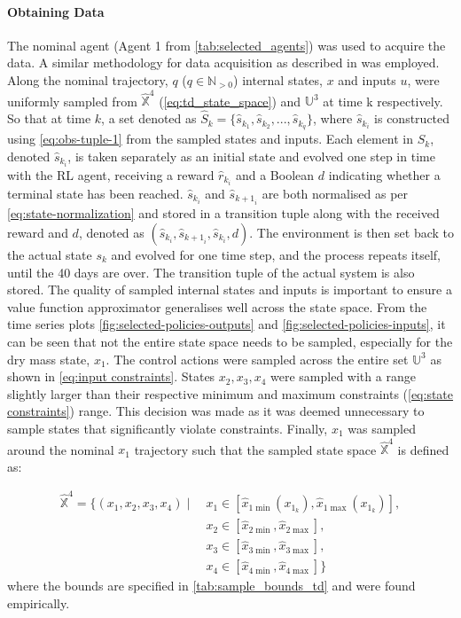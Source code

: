 \paragraph{Obtaining Data}
The nominal agent (Agent 1 from \autoref{tab:selected_agents}) was used to acquire the data. A similar methodology for data acquisition as described in \citet{linReinforcementLearningBasedModel2023} was employed. Along the nominal trajectory, $q$ ($q \in \mathbb{N}_{>0}$) internal states, $x$ and inputs $u$, were uniformly sampled from $\hat{\mathbb{X}}^4$ (\autoref{eq:td_state_space}) and ${\mathbb{U}}^3$ at time k respectively. So that at time $k$, a set denoted as $\hat{S}_{k} = \{\hat{s}_{k_1},\hat{s}_{k_2},...,\hat{s}_{k_q}\}$, where $\hat{s}_{k_i}$ is constructed using \autoref{eq:obs-tuple-1} from the sampled states and inputs. Each element in $\hat{S}_k$, denoted $\hat{s}_{k_i}$, is taken separately as an initial state and evolved one step in time with the RL agent, receiving a reward $\hat{r}_{k_i}$ and a Boolean $d$ indicating whether a terminal state has been reached. $\hat{s}_{k_i}$ and $\hat{s}_{{k+1}_i}$  are both normalised as per \autoref{eq:state-normalization} and stored in a transition tuple along with the received reward and $d$, denoted as $(\hat{s}_{k_i},\hat{s}_{{k+1}_i},\hat{s}_{k_i},d)$. The environment is then set back to the actual state $s_k$ and evolved for one time step, and the process repeats itself, until the 40 days are over. The transition tuple of the actual system is also stored. The quality of sampled internal states and inputs is important to ensure a value function approximator generalises well across the state space. From the time series plots \autoref{fig:selected-policies-outputs} and \autoref{fig:selected-policies-inputs}, it can be seen that not the entire state space needs to be sampled, especially for the dry mass state, $x_1$. The control actions were sampled across the entire set  $\mathbb{U}^3$ as shown in \autoref{eq:input constraints}. States $x_2,x_3,x_4$ were sampled with a range slightly larger than their respective minimum and maximum constraints (\autoref{eq:state constraints}) range. This decision was made as it was deemed unnecessary to sample states that significantly violate constraints. Finally, $x_1$ was sampled around the nominal $x_1$ trajectory such that the sampled state space $\hat{\mathbb{X}}^4$ is defined as:



\begin{equation}\label{eq:td_state_space}
\begin{split}
\hat{\mathbb{X}}^4 = \{ (x_1, x_2, x_3, x_4) \mid\ & x_1 \in [\hat{x}_{1\min}(x_{1_k}), \hat{x}_{1\max}(x_{1_k})], \\
& x_2 \in [\hat{x}_{2\min}, \hat{x}_{2\max}], \\
& x_3 \in [\hat{x}_{3\min}, \hat{x}_{3\max}], \\
& x_4 \in [\hat{x}_{4\min}, \hat{x}_{4\max}] \}
\end{split}
\end{equation}
where the bounds are specified in \autoref{tab:sample_bounds_td} and were found empirically.

